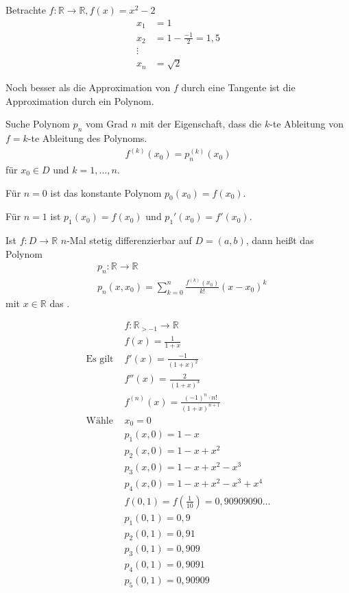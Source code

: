 Betrachte $f : \mathbb{R} \rightarrow \mathbb{R}, f(x) = x^2 - 2$
\begin{align*}
	x_1 &= 1 \\
	x_2 &= 1 - \frac{-1}{2} = 1,5 \\
	\vdots \\
	x_n &= \sqrt{2}
\end{align*}

\bigskip
Noch besser als die Approximation von $f$ durch eine Tangente ist die Approximation durch ein Polynom.

Suche Polynom $p_n$ vom Grad $n$ mit der Eigenschaft, dass die $k$-te Ableitung von $f = k$-te Ableitung des Polynoms.
\begin{align*}
	f^{(k)}(x_0) = p_n^{(k)}(x_0)
\end{align*}
für $x_0 \in D$ und $k = 1,\dots,n$.

Für $n = 0$ ist das konstante Polynom $p_0(x_0) = f(x_0)$.

Für $n = 1$ ist $p_1(x_0) = f(x_0)$ und $p_1'(x_0) = f'(x_0)$.

Ist $f : D \rightarrow \mathbb{R}$ $n$-Mal stetig differenzierbar auf $D = (a, b)$, dann heißt das Polynom
\begin{align*}
	&p_n : \mathbb{R} \rightarrow \mathbb{R} \\
	&p_n(x, x_0) = \sum_{k=0}^{n} \frac{f^{(k)}(x_0)}{k!}(x-x_0)^k
\end{align*}
mit $x \in \mathbb{R}$ das .

\begin{align*}
	&f : \mathbb{R}_{>-1} \rightarrow \mathbb{R} \\
	&f(x) = \frac{1}{1+x} \\
	\text{Es gilt } &f'(x) = \frac{-1}{(1+x)^2} \\
	&f''(x) = \frac{2}{(1+x)^3} \\
	&f^{(n)}(x) = \frac{(-1)^n \cdot n!}{(1+x)^{n+1}} \\[1cm]
	\text{Wähle } &x_0 = 0 \\
	&p_1(x, 0) = 1-x \\
	&p_2(x, 0) = 1-x + x^2 \\
	&p_3(x, 0) = 1-x + x^2 - x^3 \\
	&p_4(x, 0) = 1-x + x^2 - x^3 + x^4 \\[0.3cm]
	&f(0,1) = f\left(\frac{1}{10}\right) = 0,90909090\dots \\[0.3cm]
	&p_1(0,1) = 0,9 \\
	&p_2(0,1) = 0,91 \\
	&p_3(0,1) = 0,909 \\
	&p_4(0,1) = 0,9091 \\
	&p_5(0,1) = 0,90909
\end{align*}
